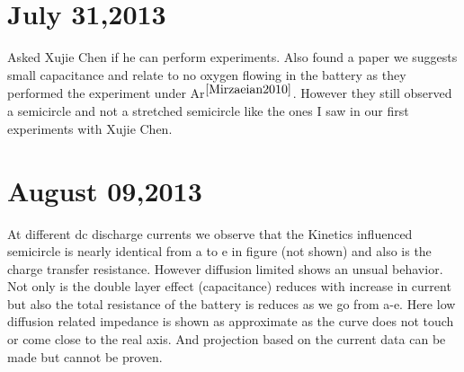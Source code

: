 \documentclass[12pt]{book}
\begin{document}
\section*{July 31,2013}
 Asked Xujie Chen if he can perform experiments. Also found a paper we suggests small capacitance and relate to no oxygen flowing in the battery as they performed the experiment under Ar$^{\cite{Mirzaeian2010}}$. However they still observed a semicircle and not a stretched semicircle like the ones I saw in our first experiments with Xujie Chen.

\section*{August 09,2013}
At different dc discharge currents we observe that the Kinetics influenced semicircle is nearly identical from a to e in figure (not shown) and also is the charge transfer resistance. However diffusion limited shows an unsual behavior. Not only is the double layer effect (capacitance) reduces with increase in current but also the total resistance of the battery is reduces as we go from a-e. Here low diffusion related impedance is shown as approximate as the curve does not touch or come close to the real axis. And projection based on the current data can be made but cannot be proven. 
\end{document}
